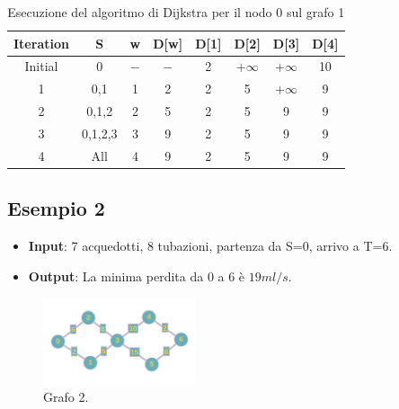 \documentclass[a4paper,12pt]{article}
\begin{document}
\begin{table}[H]
    \centering
    \begin{tabular}{cccccccc}
        \toprule
        \textbf{Iteration} & \textbf{S} & \textbf{w} & \textbf{D[w]} &
        \textbf{D[1]} & \textbf{D[2]} & \textbf{D[3]} & \textbf{D[4]} \\
        \midrule
        Initial & {0} & $-$ & $-$ & 2 & +$\infty$ & +$\infty$ & 10 \\
        1 & {0,1} & 1 & 2 & 2 & 5 & +$\infty$ & 9 \\
        2 & {0,1,2} & 2 & 5 & 2 & 5 & 9 & 9 \\
        3 & {0,1,2,3} & 3 & 9 & 2 & 5 & 9 & 9 \\
        4 & All & 4 & 9 & 2 & 5 & 9 & 9 \\
        \bottomrule
    \end{tabular}
    \caption{Esecuzione del algoritmo di Dijkstra per il nodo 0 sul grafo 1}\label{tab:Tgrafo1}
\end{table}

\clearpage
\subsection{Esempio 2}
\begin{itemize}
    \item \textbf{Input}: 7 acquedotti, 8 tubazioni, partenza da S=0, arrivo a T=6.
    
    \item \textbf{Output}: La minima perdita da 0 a 6 è $19ml/s$.
\end{itemize}

\begin{figure}[h!]
    \centering
    \includegraphics[width=0.4\textwidth]{Images/graph2.png}
    \caption{Grafo 2.}\label{fig:grafo2}
\end{figure}
\end{document}
